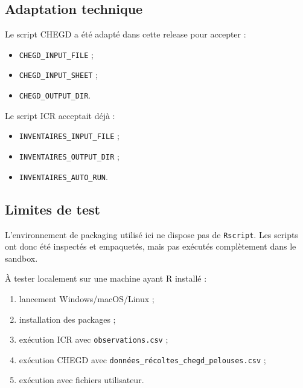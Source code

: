 \subsection{Adaptation technique}\label{adaptation-technique}

Le script CHEGD a été adapté dans cette release pour accepter :

\begin{itemize}
\tightlist
\item
  \texttt{CHEGD\_INPUT\_FILE} ;
\item
  \texttt{CHEGD\_INPUT\_SHEET} ;
\item
  \texttt{CHEGD\_OUTPUT\_DIR}.
\end{itemize}

Le script ICR acceptait déjà :

\begin{itemize}
\tightlist
\item
  \texttt{INVENTAIRES\_INPUT\_FILE} ;
\item
  \texttt{INVENTAIRES\_OUTPUT\_DIR} ;
\item
  \texttt{INVENTAIRES\_AUTO\_RUN}.
\end{itemize}

\subsection{Limites de test}\label{limites-de-test}

L'environnement de packaging utilisé ici ne dispose pas de
\texttt{Rscript}. Les scripts ont donc été inspectés et empaquetés, mais
pas exécutés complètement dans le sandbox.

À tester localement sur une machine ayant R installé :

\begin{enumerate}
\def\labelenumi{\arabic{enumi}.}
\tightlist
\item
  lancement Windows/macOS/Linux ;
\item
  installation des packages ;
\item
  exécution ICR avec \texttt{observations.csv} ;
\item
  exécution CHEGD avec \texttt{données\_récoltes\_chegd\_pelouses.csv} ;
\item
  exécution avec fichiers utilisateur.
\end{enumerate}
